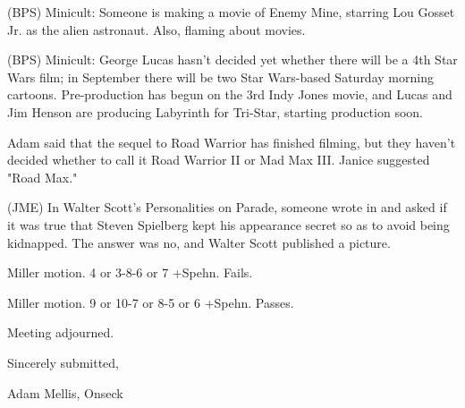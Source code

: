 \documentclass[12pt]{article}
\begin{document}
(BPS) Minicult: Someone is making a movie of Enemy Mine, starring Lou Gosset Jr. as the alien astronaut. Also, flaming about movies.

(BPS) Minicult: George Lucas hasn't decided yet whether there will be a 4th Star Wars film; in September there will be two Star Wars-based Saturday morning cartoons. Pre-production has begun on the 3rd Indy Jones movie, and Lucas and Jim Henson are producing Labyrinth for Tri-Star, starting production soon.

Adam said that the sequel to Road Warrior has finished filming, but they haven't decided whether to call it Road Warrior II or Mad Max III. Janice suggested "Road Max."

(JME) In Walter Scott's Personalities on Parade, someone wrote in and asked if it was true that Steven Spielberg kept his appearance secret so as to avoid being kidnapped. The answer was no, and Walter Scott published a picture.

Miller motion. 4 or 3-8-6 or 7 +Spehn. Fails.

Miller motion. 9 or 10-7 or 8-5 or 6 +Spehn. Passes.

\vspace{12pt}

\noindent
Meeting adjourned.

\vspace{18pt}

\centerline{Sincerely submitted,}
\centerline{Adam Mellis, Onseck}
\end{document}
